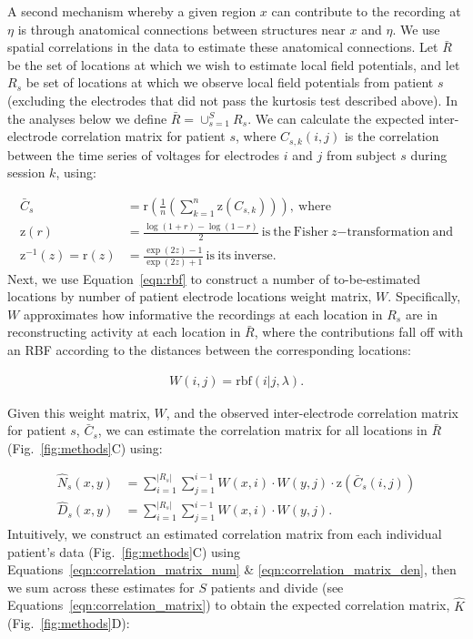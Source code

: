 \documentclass[11pt]{article}
\begin{document}
A second mechanism whereby a given region $x$ can contribute to the
recording at $\eta$ is through anatomical connections between
structures near $x$ and $\eta$.  We use spatial correlations in the
data to estimate these anatomical connections.  Let $\bar{R}$ be the
set of locations at which we wish to estimate local field potentials,
and let $R_{s}$ be set of locations at which we observe local field
potentials from patient $s$ (excluding the electrodes that did not
pass the kurtosis test described above). In the analyses below we
define $\bar{R} = \cup_{s=1}^S R_s$.  We can calculate the expected
inter-electrode correlation matrix for patient $s$, where
$C_{s,k}(i,j)$ is the correlation between the time series of voltages
for electrodes $i$ and $j$ from subject $s$ during session $k$, using:

\begin{align}
  \bar{C}_{s} &=
  \mathrm{r}(\frac{1}{n}(\sum_{k=1}^{n}\mathrm{z}(C_{s,k}))),\label{eqn:inter_corr}~\mathrm{where}\\
\mathrm{z}(r) &= \frac{\log(1+r) - \log(1 - r)}{2}~\mathrm{is~the~Fisher}~z \mathrm{-transformation~and}\label{eqn:fishersz}\\
\mathrm{z}^{-1}(z) = \mathrm{r}(z) &= \frac{\exp(2z) - 1}{\exp(2z) + 1}\mathrm{~is~its~inverse}.\label{eqn:invfishersz}
\end{align}
Next, we use Equation~\ref{eqn:rbf} to construct a number of
to-be-estimated locations by number of patient electrode locations
weight matrix, $W$.  Specifically, $W$ approximates how informative the
recordings at each location in $R_s$ are in reconstructing activity at
each location in $\bar{R}$, where the contributions fall off with an RBF according to
the distances between the corresponding locations:

\begin{align}
W(i, j) = \mathrm{rbf}(i|j,\lambda)\label{eqn:weight_matrix}.
\end{align}

Given this weight matrix, $W$,
and the observed inter-electrode correlation matrix for patient $s$,
$\bar{C}_{s}$, we can estimate the correlation matrix for all locations in
$\bar{R}$ (Fig.~\ref{fig:methods}C) using:

\begin{align}
\hat{N}_{s}(x,y) & = { \sum_{i = 1}^{| R_{s}|}\sum_{j=1}^{i-1} W(x,i) \cdot W(y,j)\cdot \mathrm{z}(\bar{C}_{s}(i,j))}\label{eqn:correlation_matrix_num}\\
 \hat{D}_{s}(x,y) & = \sum_{i = 1}^{| R_{s}|}\sum_{j=1}^{i-1} W(x,i) \cdot W(y,j). \label{eqn:correlation_matrix_den}
\end{align}
Intuitively, we construct an estimated correlation matrix from each
individual patient's data (Fig.~\ref{fig:methods}C) using
Equations~\ref{eqn:correlation_matrix_num} \& \ref{eqn:correlation_matrix_den}, then we sum across these estimates for $S$ patients and divide (see Equations~\ref{eqn:correlation_matrix}) to obtain the expected correlation
matrix, $\hat{K}$ (Fig.~\ref{fig:methods}D):
\end{document}
